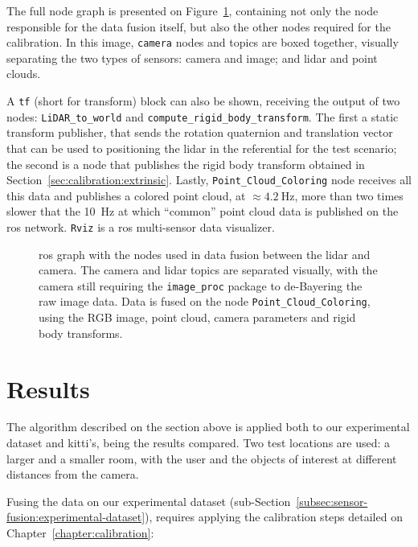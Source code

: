 The full node graph is presented on Figure~\ref{fig:sensor-fusion-rosgraph}, containing not only the node responsible for the data fusion itself, but also the other nodes required for the calibration. In this image, \texttt{camera} nodes and topics are boxed together, visually separating the two types of sensors: camera and image; and \ac{lidar} and point clouds.

A \texttt{tf} (short for transform) block can also be shown, receiving the output of two nodes: \texttt{LiDAR\_to\_world} and \texttt{compute\_rigid\_body\_transform}. The first a static transform publisher, that sends the rotation quaternion and translation vector that can be used to positioning the \ac{lidar} in the referential for the test scenario; the second is a node that publishes the rigid body transform obtained in Section~\ref{sec:calibration:extrinsic}. Lastly, \texttt{Point\_Cloud\_Coloring} node receives all this data and publishes a colored point cloud, at $\approx \SI{4.2}{\hertz}$, more than two times slower that the \SI{10}{\hertz} at which ``common'' point cloud data is published on the \ac{ros} network. \texttt{Rviz} is a \ac{ros} multi-sensor data visualizer.


\begin{figure}[!ht]
	\centering
	\def\svgwidth{\columnwidth}
	\graphicspath{{img/sensor_fusion/}}
		
		\caption[\ac{ros} node graph implemented for coloring the point cloud.]{\ac{ros} graph with the nodes used in data fusion between the \ac{lidar} and camera. The camera and \ac{lidar} topics are separated visually, with the camera still requiring the \texttt{image\_proc} package to de-Bayering the raw image data. Data is fused on the node \texttt{Point\_Cloud\_Coloring}, using the RGB image, point cloud, camera parameters and rigid body transforms.}
	\label{fig:sensor-fusion-rosgraph}
\end{figure}


\section{Results}
The algorithm described on the section above is applied both to our experimental dataset and \ac{kitti}'s, being the results compared. Two test locations are used: a larger and a smaller room, with the user and the objects of interest at different distances from the camera.

Fusing the data on our experimental dataset (sub-Section~\ref{subsec:sensor-fusion:experimental-dataset}), requires applying the calibration steps detailed on Chapter~\ref{chapter:calibration}:

